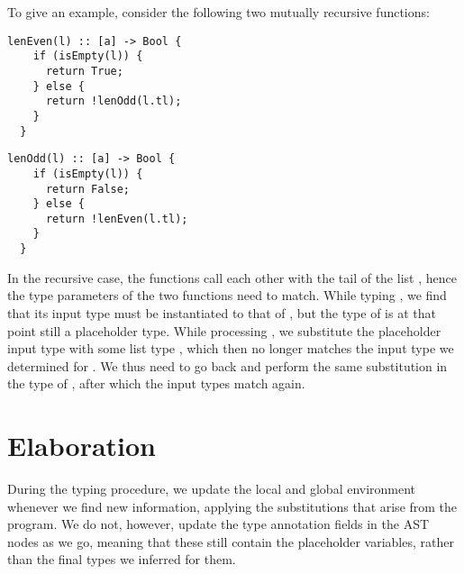 To give an example, consider the following two mutually recursive functions:

\begin{minipage}{.5\textwidth}
  \centering
\begin{lstlisting}[language=SPL]
  lenEven(l) :: [a] -> Bool {
    if (isEmpty(l)) {
      return True;
    } else {
      return !lenOdd(l.tl);
    }
  }
\end{lstlisting}
\end{minipage}%
\begin{minipage}{.5\textwidth}
  \centering
\begin{lstlisting}[language=SPL]
  lenOdd(l) :: [a] -> Bool {
    if (isEmpty(l)) {
      return False;
    } else {
      return !lenEven(l.tl);
    }
  }
\end{lstlisting}
\end{minipage}\vspace{2mm}

In the recursive case, the functions call each other with the tail of the list
, hence the type parameters of the two functions need to match.
While typing , we find that its input type must be instantiated to
that of , but the type of  is at that point still a
placeholder type.
While processing , we substitute the placeholder input type with
some list type \spl{[$\alpha$]}, which then no longer matches the input type we
determined for . We thus need to go back and perform the same
substitution in the type of , after which the input types match
again.


\section{Elaboration}

During the typing procedure, we update the local and global environment whenever
we find new information, applying the substitutions that arise from the program.
We do not, however, update the type annotation fields in the AST nodes as we go,
meaning that these still contain the placeholder variables, rather than the
final types we inferred for them.

